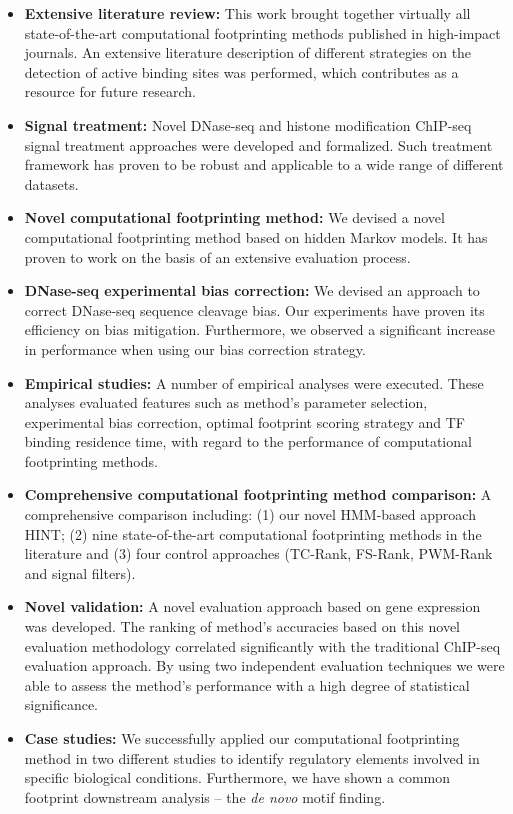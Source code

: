 \begin{itemize}
  \item \textbf{Extensive literature review:} This work brought together virtually all state-of-the-art computational footprinting methods published in high-impact journals. An extensive literature description of different strategies on the detection of active binding sites was performed, which contributes as a resource for future research.
  \item \textbf{Signal treatment:} Novel DNase-seq and histone modification ChIP-seq signal treatment approaches were developed and formalized. Such treatment framework has proven to be robust and applicable to a wide range of different datasets.
  \item \textbf{Novel computational footprinting method:} We devised a novel computational footprinting method based on hidden Markov models. It has proven to work on the basis of an extensive evaluation process.
  \item \textbf{DNase-seq experimental bias correction:} We devised an approach to correct DNase-seq sequence cleavage bias. Our experiments have proven its efficiency on bias mitigation. Furthermore, we observed a significant increase in performance when using our bias correction strategy.
  \item \textbf{Empirical studies:} A number of empirical analyses were executed. These analyses evaluated features such as method's parameter selection, experimental bias correction, optimal footprint scoring strategy and TF binding residence time, with regard to the performance of computational footprinting methods.
  \item \textbf{Comprehensive computational footprinting method comparison:} A comprehensive comparison including: (1) our novel HMM-based approach HINT; (2) nine state-of-the-art computational footprinting methods in the literature and (3) four control approaches (TC-Rank, FS-Rank, PWM-Rank and signal filters).
  \item \textbf{Novel validation:} A novel evaluation approach based on gene expression was developed. The ranking of method's accuracies based on this novel evaluation methodology correlated significantly with the traditional ChIP-seq evaluation approach. By using two independent evaluation techniques we were able to assess the method's performance with a high degree of statistical significance.
  \item \textbf{Case studies:} We successfully applied our computational footprinting method in two different studies to identify regulatory elements involved in specific biological conditions. Furthermore, we have shown a common footprint downstream analysis -- the \emph{de novo} motif finding.
\end{itemize}

